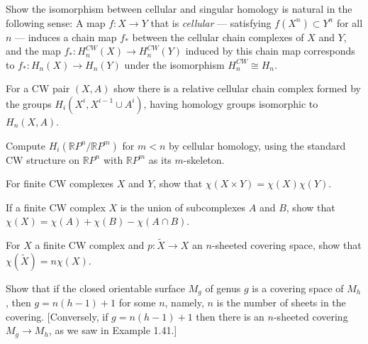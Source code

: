 \begin{exercise}
Show the isomorphism between cellular and singular homology is natural in the following sense: A map $f:X \to Y$ that is \textit{cellular} --- satisfying $f(X^n) \subset Y^n$ for all $n$ --- induces a chain map $f_*$ between the cellular chain complexes of $X$ and $Y$, and the map $f_*: H_n^{CW}(X) \to H_n^{CW}(Y)$ induced by this chain map corresponds to $f_*: H_n(X) \to H_n(Y)$ under the isomorphism $H_n^{CW} \cong H_n$.
\end{exercise}

\begin{exercise}
For a CW pair $(X,A)$ show there is a relative cellular chain complex formed by the groups $H_i(X^i, X^{i-1} \cup A^i)$, having homology groups isomorphic to $H_n(X,A)$.
\end{exercise}

\begin{exercise}
Compute $H_i(\mathbb{R}P^n / \mathbb{R}P^m)$ for $m < n$ by cellular homology, using the standard CW structure on $\mathbb{R}P^n$ with $\mathbb{R}P^m$ as its $m$-skeleton.
\end{exercise}

\begin{exercise}
For finite CW complexes $X$ and $Y$, show that $\chi(X \times Y) = \chi(X) \chi(Y)$.
\end{exercise}

\begin{exercise}
If a finite CW complex $X$ is the union of subcomplexes $A$ and $B$, show that $\chi(X) = \chi(A) + \chi(B) - \chi(A \cap B)$.
\end{exercise}

\begin{exercise}
For $X$ a finite CW complex and $p: \tilde{X} \to X$ an $n$-sheeted covering space, show that $\chi(\tilde{X}) = n \chi(X)$.
\end{exercise}

\begin{exercise}
Show that if the closed orientable surface $M_g$ of genus $g$ is a covering space of $M_h$, then $g = n(h-1) + 1$ for some $n$, namely, $n$ is the number of sheets in the covering. [Conversely, if $g = n(h-1) + 1$ then there is an $n$-sheeted covering $M_g \to M_h$, as we saw in Example 1.41.]
\end{exercise}

